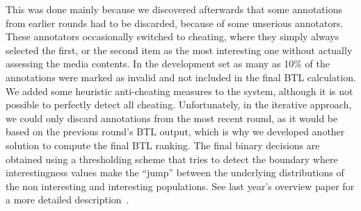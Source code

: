 \documentclass[sigconf]{acmart-me}
\begin{document}
This was done mainly because we discovered afterwards that some annotations from earlier rounds had to be discarded, because of some unserious annotators. %
These annotators occasionally switched to cheating, where they simply always selected the first, or the second item as the most interesting one without actually assessing the media contents.
In the development set as many as 10\% of the annotations were marked as invalid and not included in the final BTL calculation. We added some heuristic anti-cheating measures to the system, although it is not possible to perfectly detect all cheating.
Unfortunately, in the iterative approach, we could only discard annotations from the most recent round, as it would be based on the previous round's BTL output, which is why we developed another solution to compute the final BTL ranking.
The final binary decisions are obtained using a thresholding scheme that tries to detect the boundary where interestingness values make the ``jump'' between the underlying distributions of the non interesting and interesting populations.  See last year's overview paper for a more detailed description~\cite{demarty2016mediaeval}.

  


\end{document}
